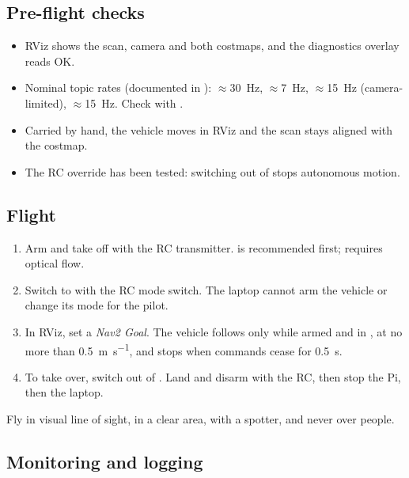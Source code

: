 \subsection{Pre-flight checks}

\begin{itemize}[leftmargin=*,itemsep=1pt]
  \item RViz shows the scan, camera and both costmaps, and the diagnostics overlay
    reads OK.
  \item Nominal topic rates (documented in ):
     $\approx$\SI{30}{\hertz},  $\approx$\SI{7}{\hertz},
     $\approx$\SI{15}{\hertz} (camera-limited),
     $\approx$\SI{15}{\hertz}. Check with
    .
  \item Carried by hand, the vehicle moves in RViz and the scan stays aligned with the
    costmap.
  \item The RC override has been tested: switching out of  stops
    autonomous motion.
\end{itemize}

\subsection{Flight}

\begin{enumerate}[leftmargin=*,itemsep=1pt]
  \item Arm and take off with the RC transmitter.  is recommended
    first;  requires optical flow.
  \item Switch to  with the RC mode switch. The laptop cannot arm the
    vehicle or change its mode for the pilot.
  \item In RViz, set a \emph{Nav2 Goal}. The vehicle follows only while armed and in
    , at no more than \SI{0.5}{\metre\per\second}, and stops when
    commands cease for \SI{0.5}{\second}.
  \item To take over, switch out of . Land and disarm with the RC, then
    stop the Pi, then the laptop.
\end{enumerate}
Fly in visual line of sight, in a clear area, with a spotter, and never over people.

\subsection{Monitoring and logging}

